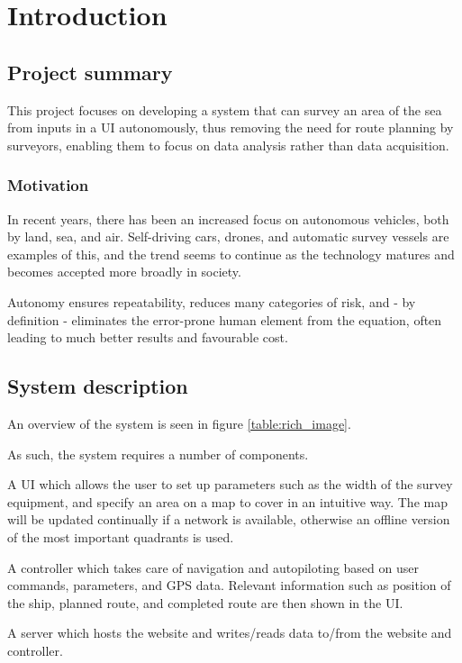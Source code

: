 \chapter{Introduction}

\section{Project summary}
This project focuses on developing a system that can survey an area of the sea from inputs in a UI autonomously, thus removing the need for route planning by surveyors, enabling them to focus on data analysis rather than data acquisition. 

\subsection{Motivation}
In recent years, there has been an increased focus on autonomous vehicles, both by land, sea, and air. Self-driving cars, drones, and automatic survey vessels are examples of this, and the trend seems to continue as the technology matures and becomes accepted more broadly in society.

Autonomy ensures repeatability, reduces many categories of risk, and - by definition - eliminates the error-prone human element from the equation, often leading to much better results and favourable cost.
 
\section{System description}

An overview of the system is seen in figure \ref{table:rich_image}.

As such, the system requires a number of components. 

A UI which allows the user to set up parameters such as the width of the survey equipment, and specify an area on a map to cover in an intuitive way. The map will be updated continually if a network is available, otherwise an offline version of the most important quadrants is used.

A controller which takes care of navigation and autopiloting based on user commands, parameters, and GPS data. Relevant information such as position of the ship, planned route, and completed route are then shown in the UI.

A server which hosts the website and writes/reads data to/from the website and controller.

